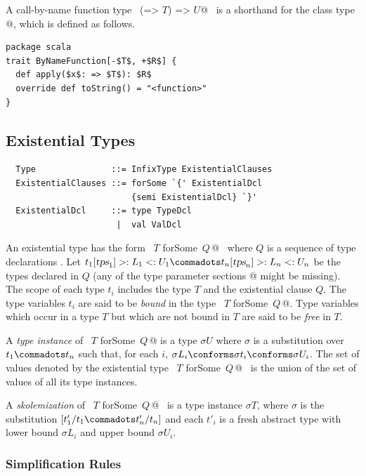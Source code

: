 A call-by-name function type ~\lstinline@(=> $T$) => $U$@~ is a
shorthand for the class type
\lstinline@ByNameFunction[$T$,$U\,$]@, which is defined as follows.
\begin{lstlisting}
package scala 
trait ByNameFunction[-$T$, +$R$] {
  def apply($x$: => $T$): $R$ 
  override def toString() = "<function>" 
}
\end{lstlisting}

\subsection{Existential Types}
\label{sec:existential-types}

\syntax\begin{lstlisting}
  Type               ::= InfixType ExistentialClauses
  ExistentialClauses ::= forSome `{' ExistentialDcl 
                         {semi ExistentialDcl} `}'
  ExistentialDcl     ::= type TypeDcl 
                      |  val ValDcl
\end{lstlisting}
An existential type has the form ~\lstinline@$T$ forSome {$\,Q\,$}@~
where $Q$ is a sequence of type declarations .
Let $t_1[\tps_1] >: L_1 <: U_1 \commadots t_n[\tps_n] >: L_n <: U_n$ 
be the types declared in $Q$ (any of the 
type parameter sections \lstinline@[$\tps_i$]@ might be missing).
The scope of each type $t_i$ includes the type $T$ and the existential clause $Q$. 
The type variables $t_i$ are said to be {\em bound} in the type ~\lstinline@$T$ forSome {$\,Q\,$}@.
Type variables which occur in a type $T$ but which are not bound in $T$ are said
to be {\em free} in $T$.

A {\em type instance} of ~\lstinline@$T$ forSome {$\,Q\,$}@ 
is a type $\sigma U$ where $\sigma$ is a substitution over $t_1 \commadots t_n$
such that, for each $i$, $\sigma L_i \conforms \sigma t_i \conforms \sigma U_i$.
The set of values denoted by the existential type ~\lstinline@$T$ forSome {$\,Q\,$}@~
is the union of the set of values of all its type instances.

A {\em skolemization} of ~\lstinline@$T$ forSome {$\,Q\,$}@~ is
a type instance $\sigma T$, where $\sigma$ is the substitution
$[t'_1/t_1 \commadots t'_n/t_n]$ and each $t'_i$ is a fresh abstract type
with lower bound $\sigma L_i$ and upper bound $\sigma U_i$.

\subsubsection*{Simplification Rules}\label{sec:ex-simpl}

